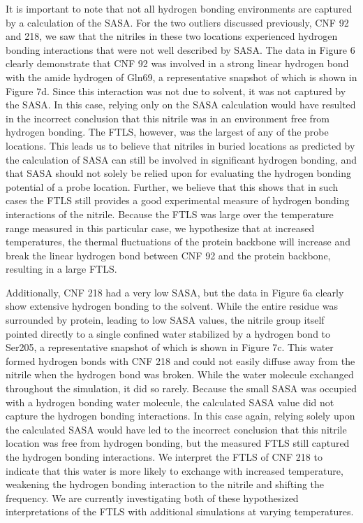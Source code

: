 It is important to note that not all hydrogen bonding environments are captured by a calculation of the SASA.
For the two outliers discussed previously, CNF 92 and 218, we saw that the nitriles in these two locations experienced hydrogen bonding interactions that were not well described by SASA.
The data in Figure 6 clearly demonstrate that CNF 92 was involved in a strong linear hydrogen bond with the amide hydrogen of Gln69, a representative snapshot of which is shown in Figure 7d.
Since this interaction was not due to solvent, it was not captured by the SASA.
In this case, relying only on the SASA calculation would have resulted in the incorrect conclusion that this nitrile was in an environment free from hydrogen bonding.
The FTLS, however, was the largest of any of the probe locations.
This leads us to believe that nitriles in buried locations as predicted by the calculation of SASA can still be involved in significant hydrogen bonding, and that SASA should not solely be relied upon for evaluating the hydrogen bonding potential of a probe location.
Further, we believe that this shows that in such cases the FTLS still provides a good experimental measure of hydrogen bonding interactions of the nitrile.
Because the FTLS was large over the temperature range measured in this particular case, we hypothesize that at increased temperatures, the thermal fluctuations of the protein backbone will increase and break the linear hydrogen bond between CNF 92 and the protein backbone, resulting in a large FTLS. 

Additionally, CNF 218 had a very low SASA, but the data in Figure 6a clearly show extensive hydrogen bonding to the solvent.
While the entire residue was surrounded by protein, leading to low SASA values, the nitrile group itself pointed directly to a single confined water stabilized by a hydrogen bond to Ser205, a representative snapshot of which is shown in Figure 7c.
This water formed hydrogen bonds with CNF 218 and could not easily diffuse away from the nitrile when the hydrogen bond was broken.
While the water molecule exchanged throughout the simulation, it did so rarely.
Because the small SASA was occupied with a hydrogen bonding water molecule, the calculated SASA value did not capture the hydrogen bonding interactions.
In this case again, relying solely upon the calculated SASA would have led to the incorrect conclusion that this nitrile location was free from hydrogen bonding, but the measured FTLS still captured the hydrogen bonding interactions.
We interpret the FTLS of CNF 218 to indicate that this water is more likely to exchange with increased temperature, weakening the hydrogen bonding interaction to the nitrile and shifting the frequency.
We are currently investigating both of these hypothesized interpretations of the FTLS with additional simulations at varying temperatures.

